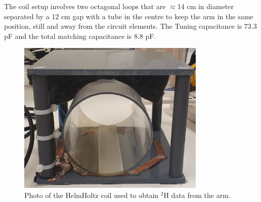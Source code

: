 \documentclass[class=article, crop=false]{standalone}
\begin{document}
The coil setup involves two octagonal loops that are $\approx$14 cm in diameter separated by a 12 cm gap with a tube in the centre to keep the arm in the same position, still and away from the circuit elements. The Tuning capacitance is 73.3 pF and the total matching capacitance is 8.8 pF.

\begin{figure}
    \centering
    \includegraphics[width=0.8\textwidth]{Figures/Theory/HelmHoltz_Coil.jpg}
    \caption{Photo of the HelmHoltz coil used to obtain $^2$H data from the arm.}
    \label{fig:theory:HelmHoltz_pic}
\end{figure}

\end{document}

